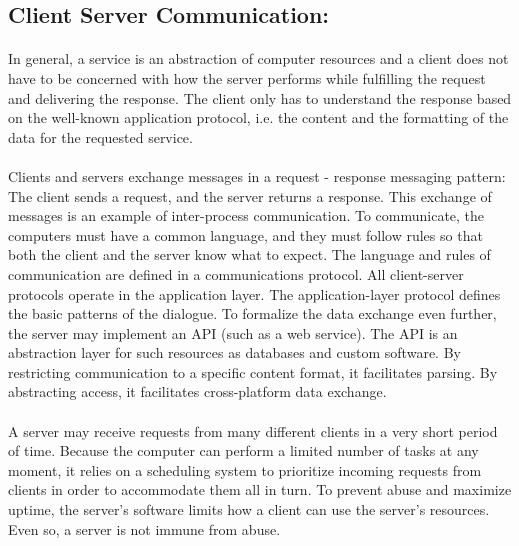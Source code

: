 \documentclass[10pt,a4paper]{article}
\begin{document}
\subsection{Client Server Communication:}
	\paragraph{} In general, a service is an abstraction of computer resources and a client does not have to be concerned with how the server performs while fulfilling the request and delivering the response. The client only has to understand the response based on the well-known application protocol, i.e. the content and the formatting of the data for the requested service.
	\paragraph{} Clients and servers exchange messages in a request - response messaging pattern: The client sends a request, and the server returns a response. This exchange of messages is an example of inter-process communication. To communicate, the computers must have a common language, and they must follow rules so that both the client and the server know what to expect. The language and rules of communication are defined in a communications protocol. All client-server protocols operate in the application layer. The application-layer protocol defines the basic patterns of the dialogue. To formalize the data exchange even further, the server may implement an API (such as a web service). The API is an abstraction layer for such resources as databases and custom software. By restricting communication to a specific content format, it facilitates parsing. By abstracting access, it facilitates cross-platform data exchange.
	\paragraph{} A server may receive requests from many different clients in a very short period of time. Because the computer can perform a limited number of tasks at any moment, it relies on a scheduling system to prioritize incoming requests from clients in order to accommodate them all in turn. To prevent abuse and maximize uptime, the server's software limits how a client can use the server's resources. Even so, a server is not immune from abuse. 
\end{document}
